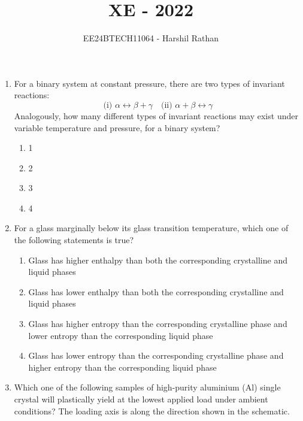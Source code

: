 \documentclass[journal,,12pt,onecolumn]{IEEEtran}
\theoremstyle{remark}
\begin{document}

\vspace{3cm}

\title{XE - 2022}
\author{EE24BTECH11064 - Harshil Rathan}
\maketitle

\bigskip

\renewcommand{\thefigure}{\theenumi}
\renewcommand{\thetable}{\theenumi}


\begin{enumerate}
    \item For a binary system at constant pressure, there are two types of invariant reactions:
    \[
    \text{(i) } \alpha \leftrightarrow \beta + \gamma \quad \text{(ii) } \alpha + \beta \leftrightarrow \gamma
    \]
    Analogously, how many different types of invariant reactions may exist under variable temperature and pressure, for a binary system?
    \begin{multicols}{2}
    \begin{enumerate}
            \item 1
            \item 2
             \item 3
            \item 4
    \end{enumerate}
    \end{multicols}
    \bigskip
\item For a glass marginally below its glass transition temperature, which one of the following statements is true?
\begin{enumerate}
        \item Glass has higher enthalpy than both the corresponding crystalline and liquid phases
        \item Glass has lower enthalpy than both the corresponding crystalline and liquid phases
        \item Glass has higher entropy than the corresponding crystalline phase and lower entropy than the corresponding liquid phase
        \item Glass has lower entropy than the corresponding crystalline phase and higher entropy than the corresponding liquid phase
\end{enumerate}
\bigskip
\item Which one of the following samples of high-purity aluminium (Al) single crystal will plastically yield at the lowest applied load under ambient conditions? The loading axis is along the direction shown in the schematic.
\begin{tikzpicture}


\end{tikzpicture}
\end{enumerate}
\end{document}
